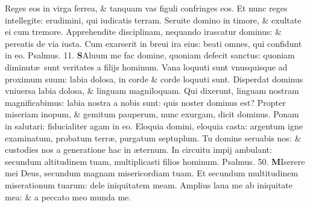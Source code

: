\documentclass[a5paper,10pt]{book}
\def\ae{æ}
\begin{document}
\begin{multicols*}{2}
\newline \color{red} R\color{black}eges eos in virga ferrea, \& tanquam vas figuli confringes eos.
\newline \color{red} E\color{black}t nunc reges intellegite: erudimini, qui iudicatis terram.
\newline \color{red} S\color{black}eruite domino in timore, \& exultate ei cum tremore.
\newline \color{red} A\color{black}pprehendite disciplinam, nequando irascatur dominus: \& pereatis de via iusta.
\newline \color{red} C\color{black}um exarserit in breui ira eius: beati omnes, qui confidunt in eo.
\newline \color{red} Psalmus. 11. \color{black}
\vspace{-.25em}
\lettrine[lines=2]{\bfseries \color{red} S}{}Aluum me fac domine, quoniam defecit sanctus: quoniam diminut\ae \ sunt veritates a filijs hominum.
\newline \color{red} V\color{black}ana loquuti sunt vnusquisque ad proximum suum: labia dolosa, in corde \& corde loquuti sunt.
\newline \color{red} D\color{black}isperdat dominus vniuersa labia dolosa, \& linguam magniloquam.
\newline \color{red} Q\color{black}ui dixerunt, linguam nostram magnificabimus: labia nostra a nobis sunt: quis noster dominus est?
\newline \color{red} P\color{black}ropter miseriam inopum, \& gemitum pauperum, nunc exurgam, dicit dominus.
\newline \color{red} P\color{black}onam in salutari: fiducialiter agam in eo.
\newline \color{red} E\color{black}loquia domini, eloquia casta: argentum igne examinatum, probatum terr\ae , purgatum septuplum.
\newline \color{red} T\color{black}u domine seruabis nos: \& custodies nos a generatione hac in \ae ternum.
\newline \color{red} I\color{black}n circuitu impij ambulant: secundum altitudinem tuam, multiplicasti filios hominum. \quad \color{red} Psalmus. 50. \color{black}
\vspace{-.5em}
\lettrine[lines=2]{\bfseries \color{red} M}{}Iserere mei Deus, secundum magnam misericordiam tuam.
\newline \color{red} E\color{black}t secundum multitudinem miserationum tuarum: dele iniquitatem meam.
\newline \color{red} A\color{black}mplius laua me ab iniquitate mea: \& a peccato meo munda me.

\end{multicols*}
\end{document}
